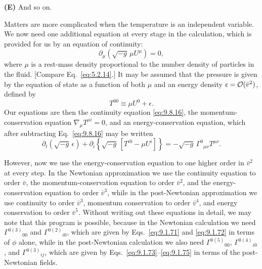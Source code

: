 \medskip
\noindent\textbf{(E)} And so on.

Matters are more complicated when the temperature is an independent
variable. We now need one additional equation at every stage in the
calculation, which is provided for us by an equation of continuity:
\begin{equation}
  \partial_\mu\left(\sqrt{-g}\,\mu U^\mu\right)=0,
  \tag{9.8.16}\label{eq:9.8.16}
\end{equation}
where \(\mu\) is a rest-mass density proportional to the number density of
particles in the fluid. [Compare Eq.~\eqref{eq:5.2.14}.] It may be assumed
that the pressure is given by the equation of state as a function of both
\(\mu\) and an energy density \(\epsilon=\mathcal{O}(\bar v^2)\), defined by
\begin{equation}
  T^{00}\equiv\mu U^0+\epsilon.
  \tag{9.8.17}\label{eq:9.8.17}
\end{equation}
Our equations are then the continuity equation \eqref{eq:9.8.16}, the
momentum-conservation equation \(\nabla_\mu T^{\mu i}=0\), and an
energy-conservation equation, which after subtracting Eq.~\eqref{eq:9.8.16}
may be written
\begin{equation}
  \partial_t\left(\sqrt{-g}\,\epsilon\right)
  +\partial_i
   \left\{\sqrt{-g}\,[T^{i0}-\mu U^i]\right\}
  =
  -\sqrt{-g}\,\Gamma^0{}_{\mu\nu}T^{\mu\nu}.
  \tag{9.8.18}\label{eq:9.8.18}
\end{equation}

However, now we use the energy-conservation equation to one higher order
in \(\bar v^2\) at every step. In the Newtonian approximation we use the
continuity equation to order \(\bar v\), the momentum-conservation equation
to order \(\bar v^2\), and the energy-conservation equation to order
\(\bar v^3\), while in the post-Newtonian approximation we use continuity
to order \(\bar v^3\), momentum conservation to order \(\bar v^4\), and
energy conservation to order \(\bar v^5\). Without writing out these
equations in detail, we may note that this program is possible, because in
the Newtonian calculation we need \(\Gamma^{0(3)}{}_{00}\) and
\(\Gamma^{0(2)}{}_{i0}\), which are given by Eqs.~\eqref{eq:9.1.71} and
\eqref{eq:9.1.72} in terms of \(\phi\) alone, while in the post-Newtonian
calculation we also need \(\Gamma^{0(5)}{}_{00}\),
\(\Gamma^{0(4)}{}_{i0}\), and \(\Gamma^{0(3)}{}_{ij}\), which are given
by Eqs.~\eqref{eq:9.1.73}--\eqref{eq:9.1.75} in terms of the
post-Newtonian fields.
